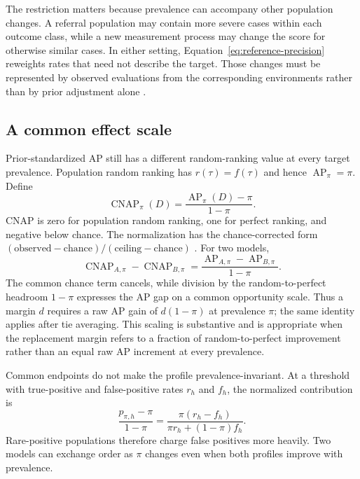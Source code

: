 \documentclass[11pt]{article}
\newcommand{\AP}{\operatorname{AP}}
\newcommand{\CNAP}{\operatorname{CNAP}}
\theoremstyle{remark}
\begin{document}
The restriction matters because prevalence can accompany other population changes. A referral population may contain more severe cases within each outcome class, while a new measurement process may change the score for otherwise similar cases. In either setting, Equation~\eqref{eq:reference-precision} reweights rates that need not describe the target. Those changes must be represented by observed evaluations from the corresponding environments rather than by prior adjustment alone \cite{bareinboim2013transportability}.

\subsection{A common effect scale}

Prior-standardized AP still has a different random-ranking value at every target prevalence. Population random ranking has $r(\tau)=f(\tau)$ and hence $\AP_\pi=\pi$. Define
\begin{equation}
\CNAP_\pi(D)
=
\frac{\AP_\pi(D)-\pi}{1-\pi}.
\label{eq:cnap}
\end{equation}
CNAP is zero for population random ranking, one for perfect ranking, and negative below chance. The normalization has the chance-corrected form $(\text{observed}-\text{chance})/(\text{ceiling}-\text{chance})$ \cite{cohen1960coefficient}. For two models,
\begin{equation}
\CNAP_{A,\pi}-\CNAP_{B,\pi}
=
\frac{\AP_{A,\pi}-\AP_{B,\pi}}{1-\pi}.
\label{eq:cnap-difference}
\end{equation}
The common chance term cancels, while division by the random-to-perfect headroom $1-\pi$ expresses the AP gap on a common opportunity scale. Thus a margin $d$ requires a raw AP gain of $d(1-\pi)$ at prevalence $\pi$; the same identity applies after tie averaging. This scaling is substantive and is appropriate when the replacement margin refers to a fraction of random-to-perfect improvement rather than an equal raw AP increment at every prevalence.

Common endpoints do not make the profile prevalence-invariant. At a threshold with true-positive and false-positive rates $r_h$ and $f_h$, the normalized contribution is
\begin{equation}
\frac{p_{\pi,h}-\pi}{1-\pi}
=
\frac{\pi(r_h-f_h)}
{\pi r_h+(1-\pi)f_h}.
\label{eq:threshold-cnap}
\end{equation}
Rare-positive populations therefore charge false positives more heavily. Two models can exchange order as $\pi$ changes even when both profiles improve with prevalence.
\end{document}
